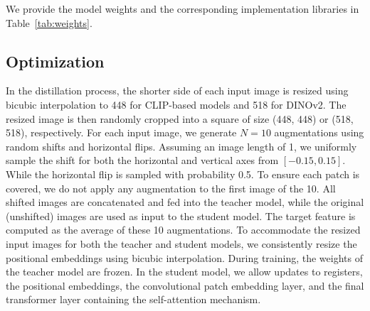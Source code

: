 \begin{table}[htbp]
\centering
\caption{\textbf{Model Implementation Libraries and Weights.} We compare models trained using different datasets and objectives.}
\vspace{.1cm}
\label{tab:weights}
\end{table}

We provide the model weights and the corresponding implementation libraries in Table~\ref{tab:weights}. 


\subsection{Optimization}
\label{opt}
In the distillation process, the shorter side of each input image is resized using bicubic interpolation to 448 for CLIP-based models and 518 for DINOv2. The resized image is then randomly cropped into a square of size (448, 448) or (518, 518), respectively. For each input image, we generate $N = 10$ augmentations using random shifts and horizontal flips. Assuming an image length of 1, we uniformly sample the shift for both the horizontal and vertical axes from $[-0.15, 0.15]$. While the horizontal flip is sampled with probability 0.5. To ensure each patch is covered, we do not apply any augmentation to the first image of the 10.  All shifted images are concatenated and fed into the teacher model, while the original (unshifted) images are used as input to the student model. The target feature is computed as the average of these 10 augmentations. To accommodate the resized input images for both the teacher and student models, we consistently resize the positional embeddings using bicubic interpolation. During training, the weights of the teacher model are frozen. In the student model, we allow updates to registers, the positional embeddings, the convolutional patch embedding layer, and the final transformer layer containing the self-attention mechanism.

